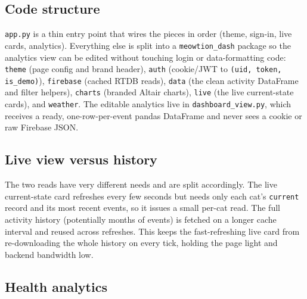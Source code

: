 \subsection{Code structure}

\texttt{app.py} is a thin entry point that wires the pieces in order (theme, sign-in, live cards,
analytics). Everything else is split into a \texttt{meowtion\_dash} package so the analytics view can
be edited without touching login or data-formatting code: \texttt{theme} (page config and brand
header), \texttt{auth} (cookie/JWT to \texttt{(uid, token, is\_demo)}), \texttt{firebase} (cached
RTDB reads), \texttt{data} (the clean activity DataFrame and filter helpers), \texttt{charts}
(branded Altair charts), \texttt{live} (the live current-state cards), and \texttt{weather}. The
editable analytics live in \texttt{dashboard\_view.py}, which receives a ready, one-row-per-event
pandas DataFrame and never sees a cookie or raw Firebase JSON.

\subsection{Live view versus history}

The two reads have very different needs and are split accordingly. The live current-state card
refreshes every few seconds but needs only each cat's \texttt{current} record and its most recent
events, so it issues a small per-cat read. The full activity history (potentially months of events) is
fetched on a longer cache interval and reused across refreshes. This keeps the fast-refreshing live
card from re-downloading the whole history on every tick, holding the page light and backend bandwidth
low.

\subsection{Health analytics}

